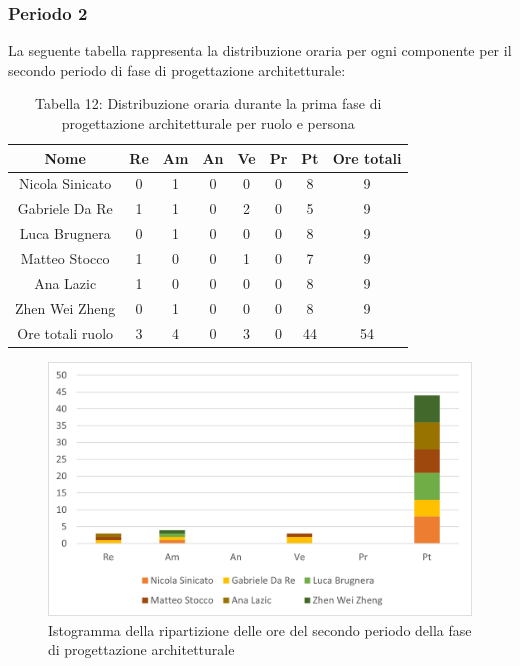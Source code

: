 \subsubsection{Periodo 2}
%
La seguente tabella rappresenta la distribuzione oraria per ogni componente per il secondo periodo di fase di progettazione architetturale:
\begin{table}[h]
	\setlength\extrarowheight{5pt}
	\centering
	\begin{tabularx}{\textwidth}{|ccccccc|c|}
		\hline
		\rowcolor{white}
		\textbf{Nome} & \textbf{Re} & \textbf{Am} & \textbf{An} & \textbf{Ve} & \textbf{Pr}& \textbf{Pt} & \textbf{Ore totali} \\
		\hline
		Nicola Sinicato &0&1&0&0&0&8&9 \\
		Gabriele Da Re &1&1&0&2&0&5&9 \\
		Luca Brugnera &0&1&0&0&0&8&9 \\
		Matteo Stocco &1&0&0&1&0&7&9 \\
		Ana Lazic &1&0&0&0&0&8&9 \\
		Zhen Wei Zheng &0&1&0&0&0&8&9 \\
		\hline
		Ore totali ruolo &3&4&0&3&0&44&54 \\
		\hline
	\end{tabularx}
	\vspace{10pt}
	\caption{Tabella 12: Distribuzione oraria durante la prima fase di progettazione architetturale per ruolo e persona}
\end{table}
\begin{figure}[H]
    \centering
    \includegraphics[scale=0.6]{img/grafi preventivo/istogrammi/architetturale/periodo2.png}
    \caption{Istogramma della ripartizione delle ore del secondo periodo della fase di progettazione architetturale}
\end{figure}
